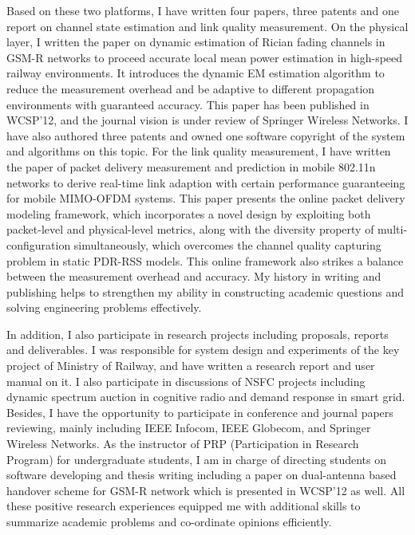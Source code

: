 \documentclass[conference,onecolumn]{IEEEtran}
\begin{document}
Based on these two platforms, I have written four papers, three patents and one report on channel state estimation and link quality measurement. On the physical layer, I written the paper on dynamic estimation of Rician fading channels in GSM-R networks to proceed accurate local mean power estimation in high-speed railway environments. It introduces the dynamic EM estimation algorithm to reduce the measurement overhead and be adaptive to different propagation environments with guaranteed accuracy. This paper has been published in WCSP'12, and the journal vision is under review of Springer Wireless Networks. I have also authored three patents and owned one software copyright of the system and algorithms on this topic. For the link quality measurement, I have written the paper of packet delivery measurement and prediction in mobile 802.11n networks to derive real-time link adaption with certain performance guaranteeing for mobile MIMO-OFDM systems. This paper presents the online packet delivery modeling framework, which incorporates a novel design by exploiting both packet-level and physical-level metrics, along with the diversity property of multi-configuration simultaneously, which overcomes the channel quality capturing problem in static PDR-RSS models. This online framework also strikes a balance between the measurement overhead and accuracy. My history in writing and publishing helps to strengthen my ability in constructing academic questions and solving engineering problems effectively.

In addition, I also participate in research projects including proposals, reports and deliverables. I was responsible for system design and experiments of the key project of Ministry of Railway, and have written a research report and user manual on it. I also participate in discussions of NSFC projects including dynamic spectrum auction in cognitive radio and demand response in smart grid. Besides, I have the opportunity to participate in conference and journal papers reviewing, mainly including IEEE Infocom, IEEE Globecom, and Springer Wireless Networks. As the instructor of PRP (Participation in Research Program) for undergraduate students, I am in charge of directing students on software developing and thesis writing including a paper on dual-antenna based handover scheme for GSM-R network which is presented in WCSP'12 as well. All these positive research experiences equipped me with additional skills to summarize academic problems and co-ordinate opinions efficiently.
\end{document}
